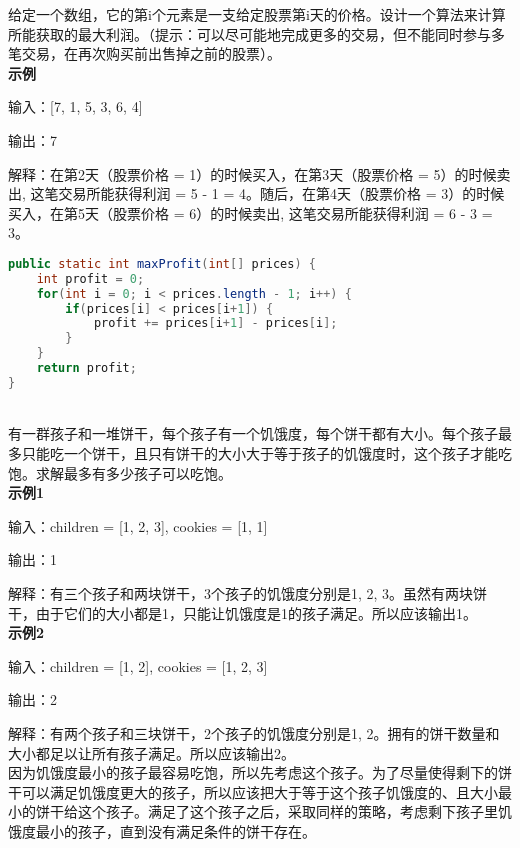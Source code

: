 给定一个数组，它的第i个元素是一支给定股票第i天的价格。设计一个算法来计算所能获取的最大利润。（提示：可以尽可能地完成更多的交易，但不能同时参与多笔交易，在再次购买前出售掉之前的股票）。 \\

\textbf{示例}

输入：[7, 1, 5, 3, 6, 4]

输出：7

解释：在第2天（股票价格 = 1）的时候买入，在第3天（股票价格 = 5）的时候卖出, 这笔交易所能获得利润 = 5 - 1 = 4。随后，在第4天（股票价格 = 3）的时候买入，在第5天（股票价格 = 6）的时候卖出, 这笔交易所能获得利润 = 6 - 3 = 3。

\vspace{-0.5cm}

\begin{lstlisting}[language=Java]
public static int maxProfit(int[] prices) {
    int profit = 0;
    for(int i = 0; i < prices.length - 1; i++) {
        if(prices[i] < prices[i+1]) {
            profit += prices[i+1] - prices[i];
        }
    }
    return profit;
}
\end{lstlisting}

\vspace{0.5cm}

 \\

有一群孩子和一堆饼干，每个孩子有一个饥饿度，每个饼干都有大小。每个孩子最多只能吃一个饼干，且只有饼干的大小大于等于孩子的饥饿度时，这个孩子才能吃饱。求解最多有多少孩子可以吃饱。 \\

\textbf{示例1}

输入：children = [1, 2, 3], cookies = [1, 1]

输出：1

解释：有三个孩子和两块饼干，3个孩子的饥饿度分别是1, 2, 3。虽然有两块饼干，由于它们的大小都是1，只能让饥饿度是1的孩子满足。所以应该输出1。 \\

\textbf{示例2}

输入：children = [1, 2], cookies = [1, 2, 3]

输出：2

解释：有两个孩子和三块饼干，2个孩子的饥饿度分别是1, 2。拥有的饼干数量和大小都足以让所有孩子满足。所以应该输出2。 \\

因为饥饿度最小的孩子最容易吃饱，所以先考虑这个孩子。为了尽量使得剩下的饼干可以满足饥饿度更大的孩子，所以应该把大于等于这个孩子饥饿度的、且大小最小的饼干给这个孩子。满足了这个孩子之后，采取同样的策略，考虑剩下孩子里饥饿度最小的孩子，直到没有满足条件的饼干存在。 \\

